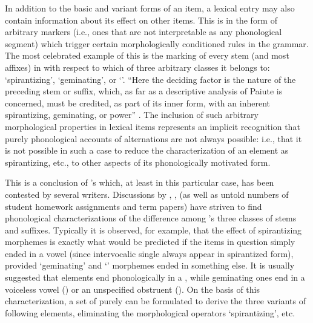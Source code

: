 In addition to the basic and variant forms of an item, a lexical entry
may also contain information about its effect on other items. This is
in the form of arbitrary markers (i.e., ones that are not
interpretable as any phonological segment) which trigger certain
morphologically conditioned rules in the grammar. The most celebrated
example of this is the marking of every stem (and most affixes) in
 with respect to which of three arbitrary classes it
belongs to: `spirantizing', `geminating', or `'. ``Here the
deciding factor is the nature of the preceding stem or suffix, which,
as far as a descriptive analysis of Paiute is concerned, must be
credited, as part of its inner form, with an inherent spirantizing,
geminating, or  power'' \citep[63]{sapir30:s.paiute}. The
inclusion of such arbitrary morphological properties in lexical items
represents an implicit recognition that purely phonological accounts
of alternations are not always possible: i.e., that it is not possible
in such a case to reduce the characterization of an element as
spirantizing, etc., to other aspects of its phonologically motivated
form.

This is a conclusion of {\Sapir}'s which, at least in this particular
case, has been contested by several writers. Discussions by
\citet{harms66:s.paiute}, \citet{mccawley67:sapir},
\citet[344ff.]{spe} (as well as untold numbers of student homework
assignments and term papers) have striven to find phonological
characterizations of the difference among {\Sapir}'s three classes of
 stems and suffixes. Typically it is observed, for
example, that the effect of spirantizing morphemes is exactly what
would be predicted if the items in question simply ended in a vowel
(since intervocalic single  always appear in spirantized
form), provided `geminating' and `' morphemes ended in
something else. It is usually suggested that  elements end
phonologically in a , while geminating ones end in a
voiceless vowel (\citeauthor{harms66:s.paiute}) or an unspecified 
obstruent (\citeauthor{spe}). On the basis of this characterization, a set of purely
 can be formulated to derive the three variants of
following elements, eliminating the morphological operators
`spirantizing', etc.

